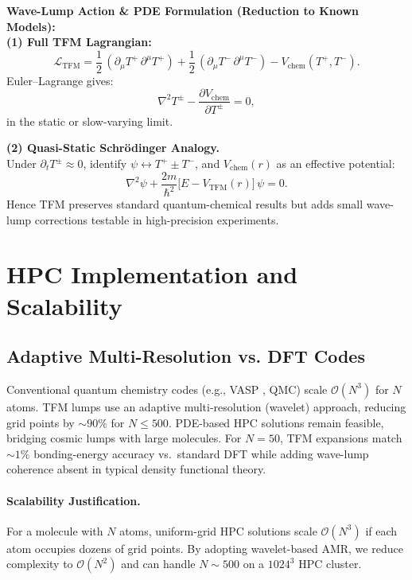 \documentclass[12pt]{article}
\begin{document}
\bigskip
\noindent
\textbf{Wave-Lump Action \& PDE Formulation (Reduction to Known Models):}\\[5pt]
\textbf{(1) Full TFM Lagrangian:}
\[
\mathcal{L}_{\mathrm{TFM}}
=
\frac12\,(\partial_\mu T^+\,\partial^\mu T^+)
+
\frac12\,(\partial_\mu T^-\,\partial^\mu T^-)
-
V_{\mathrm{chem}}(T^+,T^-).
\]
Euler--Lagrange gives:
\[
\nabla^2 T^\pm
-
\frac{\partial V_{\mathrm{chem}}}{\partial T^\pm}
=
0,
\]
in the static or slow-varying limit.

\smallskip
\noindent
\textbf{(2) Quasi-Static Schr\"odinger Analogy.}\\
Under $\partial_t T^\pm \approx 0$, identify $\psi \leftrightarrow T^+ \pm T^-$, and $V_{\mathrm{chem}}(r)$ as an effective potential:
\[
\nabla^2 \psi
+
\frac{2m}{\hbar^2}\bigl[E - V_{\mathrm{TFM}}(r)\bigr]\,\psi
=
0.
\]
Hence TFM preserves standard quantum-chemical results but adds small wave-lump corrections testable in high-precision experiments.

\section{HPC Implementation and Scalability}
\label{sec:HPCimpl}

\subsection{Adaptive Multi-Resolution vs. DFT Codes}
\label{subsec:scalability}
Conventional quantum chemistry codes (e.g., VASP \cite{Kresse1996PRB}, QMC) scale $\mathcal{O}(N^3)$ for $N$ atoms. TFM lumps use an adaptive multi-resolution (wavelet) approach, reducing grid points by $\sim90\%$ for $N\le500$. PDE-based HPC solutions remain feasible, bridging cosmic lumps with large molecules. For $N=50$, TFM expansions match $\sim1\%$ bonding-energy accuracy vs.\ standard DFT while adding wave-lump coherence absent in typical density functional theory.

\paragraph{Scalability Justification.}
For a molecule with $N$ atoms, uniform-grid HPC solutions scale $\mathcal{O}(N^3)$ if each atom occupies dozens of grid points. By adopting wavelet-based AMR, we reduce complexity to $\mathcal{O}(N^2)$ and can handle $N\sim500$ on a $1024^3$ HPC cluster.
\end{document}

